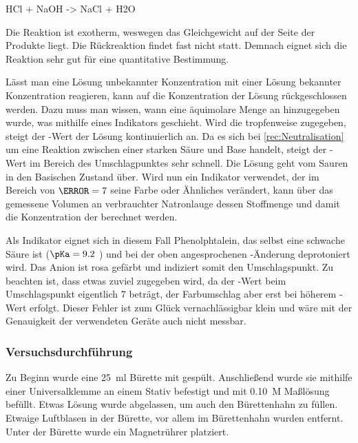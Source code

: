 \documentclass{article}
\begin{document}
        \begin{reaction}
          HCl\aq{} + NaOH\aq{} -> NaCl\aq{} + H2O \label{rec:Neutralisation}        
        \end{reaction}
        
        Die Reaktion ist exotherm, weswegen das Gleichgewicht auf der Seite der Produkte liegt. Die Rückreaktion findet fast nicht statt. Demnach eignet sich die Reaktion sehr gut für eine quantitative Bestimmung.
        
        Lässt man eine  Lösung unbekannter Konzentration mit einer  Lösung bekannter Konzentration reagieren, kann auf die Konzentration der  Lösung rückgeschlossen werden. Dazu muss man wissen, wann eine äquimolare Menge an  hinzugegeben wurde, was mithilfe eines Indikators geschieht. Wird die  tropfenweise zugegeben, steigt der \pH-Wert der Lösung kontinuierlich an. Da es sich bei \ref{rec:Neutralisation} um eine Reaktion zwischen einer starken Säure und Base handelt, steigt der \pH-Wert im Bereich des Umschlagpunktes sehr schnell. Die Lösung geht vom Sauren in den Basischen Zustand über. Wird nun ein Indikator verwendet, der im Bereich von $\pH=7$ seine Farbe oder Ähnliches verändert, kann über das gemessene Volumen an verbrauchter Natronlauge dessen Stoffmenge und damit die Konzentration der  berechnet werden.
        
        Als Indikator eignet sich in diesem Fall Phenolphtalein, das selbst eine schwache Säure ist ($\pKa = 9.2$ \cite{Phenolphtalein}) und bei der oben angesprochenen \pH-Änderung deprotoniert wird. Das Anion ist rosa gefärbt und indiziert somit den Umschlagspunkt. Zu beachten ist, dass etwas zuviel  zugegeben wird, da der \pH-Wert beim Umschlagspunkt eigentlich 7 beträgt, der Farbumschlag aber erst bei höherem \pH-Wert erfolgt. Dieser Fehler ist zum Glück vernachlässigbar klein und wäre mit der Genauigkeit der verwendeten Geräte auch nicht messbar. \label{seite}
        
      \subsubsection{Versuchsdurchführung} \label{sec:VersuchSalz}
        
        Zu Beginn wurde eine \SI[mode=text,separate-uncertainty=true]{25}{\milli\litre} Bürette mit  gespült. Anschließend wurde sie mithilfe einer Universalklemme an einem Stativ befestigt und mit \SI[mode=text]{0.10}{M}  Maßlösung befüllt. Etwas Lösung wurde abgelassen, um auch den Bürettenhahn zu füllen. Etwaige Luftblasen in der Bürette, vor allem im Bürettenhahn wurden entfernt. Unter der Bürette wurde ein Magnetrührer platziert. 
        
\end{document}
